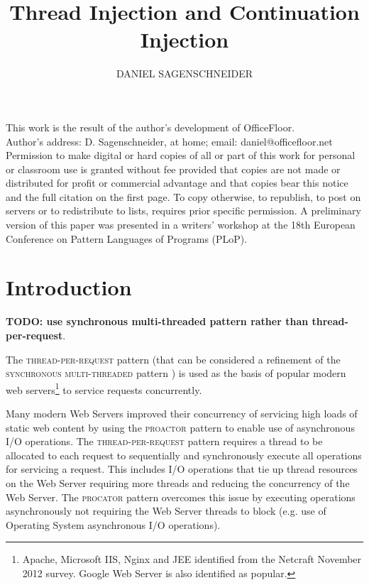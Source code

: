 \documentclass[prodmode]{style/acmlarge}
\title{Thread Injection and Continuation Injection}
\author{DANIEL SAGENSCHNEIDER \affil{daniel@officefloor.net}}
\begin{document}
\begin{bottomstuff}
This work is the result of the author's development of OfficeFloor.\\
Author's address: D. Sagenschneider, at home; email: daniel@officefloor.net\\

Permission to make digital or hard copies of all or part of this work for
personal or classroom use is granted without fee provided that copies are not
made or distributed for profit or commercial advantage and that copies bear this
notice and the full citation on the first page. To copy otherwise, to republish,
to post on servers or to redistribute to lists, requires prior specific
permission. A preliminary version of this paper was presented in a writers'
workshop at the 18th European Conference on Pattern Languages of Programs
(PLoP).
\end{bottomstuff}

\maketitle


\section{Introduction}


\textbf{TODO: use synchronous multi-threaded pattern rather than thread-per-request}.

The \textsc{thread-per-request} pattern \cite{thread-per-request} (that can be
considered a refinement of the \textsc{synchronous multi-threaded} pattern
\cite{proactor}) is used as the basis of popular modern web
servers\footnote{Apache, Microsoft IIS, Nginx and JEE identified from the
Netcraft November 2012 survey.  Google Web Server is also identified as
popular.} to service requests concurrently.

Many modern Web Servers improved their concurrency of servicing high loads of
static web content by using the \textsc{proactor} pattern \cite{proactor} to
enable use of asynchronous I/O operations.  The \textsc{thread-per-request}
pattern requires a thread to be allocated to each request to sequentially and
synchronously execute all operations for servicing a request.  This includes I/O
operations that tie up thread resources on the Web Server requiring more threads
and reducing the concurrency of the Web Server.  The \textsc{procator} pattern
overcomes this issue by executing operations asynchronously not requiring the
Web Server threads to block (e.g. use of Operating System asynchronous I/O
operations).
\end{document}
